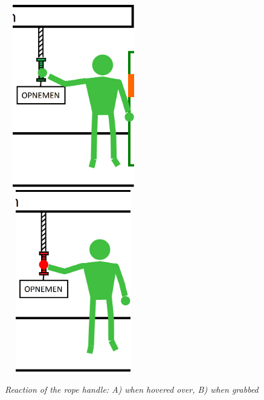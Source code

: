 \begin{figure}[H]
	\begin{center}
		\includegraphics[width=6cm, height=8cm]{figures/2_hover_over_rope.png}
		\includegraphics[width=6cm, height=8cm]{figures/3_grab_rope.png}
		\caption{\emph{Reaction of the rope handle: A) when hovered over, B) when grabbed}}
		\label{rope handle reaction}
	\end{center}
\end{figure}


